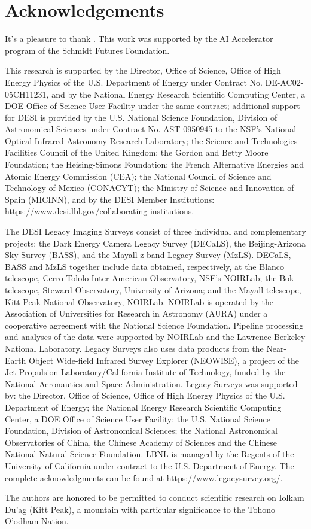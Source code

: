 \documentclass[12pt, letterpaper, preprint, comicneue]{aastex63}
\begin{document}






\section*{Acknowledgements}
It's a pleasure to thank . 
This work was supported by the AI Accelerator program of the Schmidt Futures
Foundation.

This research is supported by the Director, Office of Science, Office of High
Energy Physics of the U.S. Department of Energy under Contract No.
DE-AC02-05CH11231, and by the National Energy Research Scientific Computing
Center, a DOE Office of Science User Facility under the same contract;
additional support for DESI is provided by the U.S. National Science
Foundation, Division of Astronomical Sciences under Contract No. AST-0950945 to
the NSF's National Optical-Infrared Astronomy Research Laboratory; the Science
and Technologies Facilities Council of the United Kingdom; the Gordon and Betty
Moore Foundation; the Heising-Simons Foundation; the French Alternative
Energies and Atomic Energy Commission (CEA); the National Council of Science
and Technology of Mexico (CONACYT); the Ministry of Science and Innovation of
Spain (MICINN), and by the DESI Member Institutions:
\url{https://www.desi.lbl.gov/collaborating-institutions}.

The DESI Legacy Imaging Surveys consist of three individual and complementary
projects: the Dark Energy Camera Legacy Survey (DECaLS), the Beijing-Arizona
Sky Survey (BASS), and the Mayall z-band Legacy Survey (MzLS). 
DECaLS, BASS and MzLS together include data obtained, respectively, at the
Blanco telescope, Cerro Tololo Inter-American Observatory, NSF’s NOIRLab; the
Bok telescope, Steward Observatory, University of Arizona; and the Mayall
telescope, Kitt Peak National Observatory, NOIRLab. NOIRLab is operated by the
Association of Universities for Research in Astronomy (AURA) under a
cooperative agreement with the National Science Foundation. 
Pipeline processing and analyses of the data were supported by NOIRLab and the
Lawrence Berkeley National Laboratory.
Legacy Surveys also uses data products from the Near-Earth Object Wide-field
Infrared Survey Explorer (NEOWISE), a project of the Jet Propulsion
Laboratory/California Institute of Technology, funded by the National
Aeronautics and Space Administration. 
Legacy Surveys was supported by: the Director, Office of Science, Office of
High Energy Physics of the U.S.  Department of Energy; the National Energy
Research Scientific Computing Center, a DOE Office of Science User Facility;
the U.S. National Science Foundation, Division of Astronomical Sciences; the
National Astronomical Observatories of China, the Chinese Academy of Sciences
and the Chinese National Natural Science Foundation. 
LBNL is managed by the Regents of the University of California under contract
to the U.S. Department of Energy. 
The complete acknowledgments can be found at
\url{https://www.legacysurvey.org/}.

The authors are honored to be permitted to conduct scientific research on
Iolkam Du’ag (Kitt Peak), a mountain with particular significance to the Tohono
O’odham Nation.

\appendix





 
\end{document}
